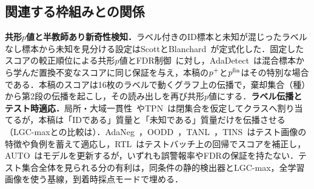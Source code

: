 \subsection{関連する枠組みとの関係}
\label{sec:related}
\textbf{共形$p$値と半教師あり新奇性検知．}ラベル付きのID標本と未知が混じったラベルなし標本から未知を見分ける設定はScottとBlanchard~\cite{scott2009novelty,blanchard2010ssnd}が定式化した．固定したスコアの較正順位による共形$p$値とFDR制御~\cite{bates2023conformal,haroush2022statistical,liang2024integrative}に対し，AdaDetect~\cite{marandon2024adadetect}は混合標本から学んだ置換不変なスコアに同じ保証を与え，本稿の$p^{+}$と$p^{\mathrm{fin}}$はその特別な場合である．本稿のスコアは16枚のラベルで動くグラフ上の伝播で，棄却集合（種）から第2段の伝播を起こし，その読み出しを再び共形$p$値にする．\textbf{ラベル伝播とテスト時適応．}局所・大域一貫性~\cite{zhou2004lgc}やTPN~\cite{liu2019tpn}は閉集合を仮定してクラスへ割り当てるが，本稿は「IDである」質量と「未知である」質量だけを伝播させる（LGC-maxとの比較は）．AdaNeg~\cite{zhang2024adaneg}，OODD~\cite{yang2025oodd}，TANL~\cite{zhang2026tanl}，TINS~\cite{yang2026tins}はテスト画像の特徴や負例を蓄えて適応し，RTL~\cite{fan2024rtl}はテストバッチ上の回帰でスコアを補正し，AUTO~\cite{yang2023auto}はモデルを更新するが，いずれも誤警報率やFDRの保証を持たない．テスト集合全体を見られる分の有利は，同条件の静的検出器とLGC-max，全学習画像を使う基線，到着時採点モードで埋める．
